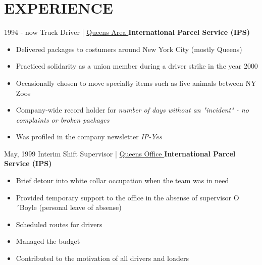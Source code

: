 \documentclass[]{friggeri-cv-theme}
\begin{document}
\section{EXPERIENCE}
\begin{entrylist}

  \entry
    {1994 - now\enspace}
    {Truck Driver | }{ \href{https://kingofqueens.fandom.com/de/wiki/International_Parcel_Service}{\small Queens Area \faMousePointer}}
    {\normalsize\textbf{\color{ipsgreen}\faMapMarker\space International Parcel Service (IPS)}}
    {\jobspace
    \begin{itemize}[leftmargin=*, itemsep = 0.1em]
    \item Delivered packages to costumers around New York City (mostly Queens)
    \item Practiced solidarity as a union member during a driver strike in the year 2000
    \item Occasionally chosen to move specialty items such as live animals between NY Zoos
    \item Company-wide record holder for \textit{number of days without an "incident" - no complaints or broken packages}
    \item Was profiled in the company newsletter \textit{IP-Yes}\\
    \end{itemize}
    }
    
  \entry
    {May, 1999\enspace}
    {Interim Shift Supervisor | }{ \href{https://kingofqueens.fandom.com/de/wiki/International_Parcel_Service}{\small Queens Office \faMousePointer}}
    {\normalsize\textbf{\color{ipsgreen}\faMapMarker\space International Parcel Service (IPS)}}
    {\jobspace
    \begin{itemize}[leftmargin=*, itemsep = 0.1em]
    \item Brief detour into white collar occupation when the team was in need
    \item Provided temporary support to the office in the absense of supervisor O´Boyle (personal leave of absense)
    \item Scheduled routes for drivers
    \item Managed the budget
    \item Contributed to the motivation of all drivers and loaders\\
    \end{itemize}
    }
    

\end{entrylist}
\end{document}
